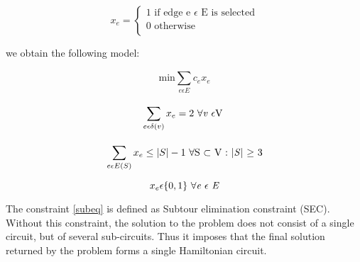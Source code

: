 \begin{equation*}
    x_e=
        \begin{cases}
            \text{1 if edge e $\epsilon$ E is selected}\\
        0 \text{ otherwise}\\
          \end{cases}
\end{equation*}

we obtain the following model:

\begin{equation}
    \text{min}\sum_{e \epsilon E}^{}c_ex_e
\end{equation}

\begin{equation}
    \sum_{e \epsilon \delta (v)}^{}x_e=2 \text{ $\forall$\textit{v} $\epsilon$V } 
\end{equation}

\begin{equation} \label{subeq}
    \sum_{e\epsilon E(S)}^{}x_e \leq |S|-1 \text{ $\forall$S $\subset$ V : |\textit{S}| $\geq$ 3}
\end{equation}

\begin{equation}
    x_e \epsilon \{0,1\} \text{ $\forall$\textit{e} $\epsilon$ \textit{E}}
\end{equation}


The constraint \ref{subeq} is defined as Subtour elimination constraint (SEC). Without this constraint, the solution to the problem does not consist of a single circuit, but of several sub-circuits. Thus it imposes that the final solution returned by the problem forms a single Hamiltonian circuit.